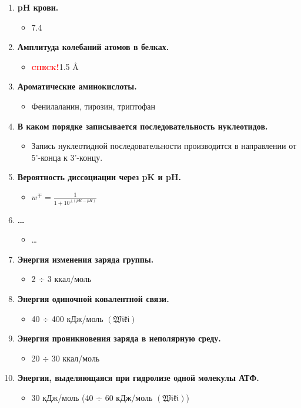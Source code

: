\documentclass[11pt]{report}    %
\newcommand{\chck}[0]{\textcolor{red}{\textsc{\textbf{check!}}\qquad}}
\newcommand{\Wiki}[0]{$\mathfrak{(Wiki)}$}
\begin{document}
\begin{enumerate}
\def\labelenumi{\arabic{enumi}.}

\item \textbf{pH крови.}
\begin{itemize}
    \item 7.4
\end{itemize}

\item \textbf{Амплитуда колебаний атомов в белках.}
\begin{itemize}
    \item \chck 1.5 \AA
\end{itemize}

\item \textbf{Ароматические аминокислоты.}
\begin{itemize}
    \item Фенилаланин, тирозин, триптофан
\end{itemize}

\item \textbf{В каком порядке записывается последовательность нуклеотидов.}
\begin{itemize}
    \item Запись нуклеотидной последовательности производится в направлении от 5'-конца к 3'-концу.
\end{itemize}

\item \textbf{Вероятность диссоциации через pK и pH.}
\begin{itemize}
    \item $w^{\mp}=\frac1{1+10^{\pm(pK-pH)}}$
\end{itemize}

\item \textbf{\ldots}
\begin{itemize}
    \item \ldots
\end{itemize}

\item \textbf{Энергия изменения заряда группы.}
\begin{itemize}
    \item 2 $\div$ 3 ккал/моль
\end{itemize}

\item \textbf{Энергия одиночной ковалентной связи.}
\begin{itemize}
    \item 40 $\div$ 400 кДж/моль \Wiki
\end{itemize}

\item \textbf{Энергия проникновения заряда в неполярную среду.}
\begin{itemize}
    \item 20 $\div$ 30 ккал/моль
\end{itemize}

\item \textbf{Энергия, выделяющаяся при гидролизе одной молекулы АТФ.}
\begin{itemize}
    \item 30 кДж/моль (40 $\div$ 60 кДж/моль \Wiki)
\end{itemize}


\end{enumerate}
\end{document}
